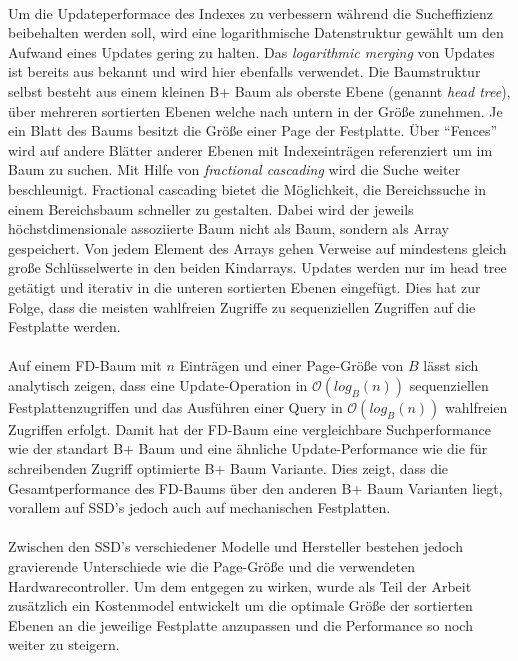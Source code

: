 \paragraph{}
Um die Updateperformace des Indexes zu verbessern während die Sucheffizienz beibehalten werden soll, wird eine logarithmische Datenstruktur gewählt um den Aufwand eines Updates gering zu halten. Das \textit{logarithmic merging} von Updates ist bereits aus  bekannt und wird hier ebenfalls verwendet. Die Baumstruktur selbst besteht aus einem kleinen B+ Baum als oberste Ebene (genannt \textit{head tree}), über mehreren sortierten Ebenen welche nach untern in der Größe zunehmen. Je ein Blatt des Baums besitzt die Größe einer Page der Festplatte. Über \enquote{Fences} wird auf andere Blätter anderer Ebenen mit Indexeinträgen referenziert um im Baum zu suchen. Mit Hilfe von \textit{fractional cascading} wird die Suche weiter beschleunigt. Fractional cascading bietet die Möglichkeit, die Bereichssuche in einem Bereichsbaum schneller zu gestalten. Dabei wird der jeweils höchstdimensionale assoziierte Baum nicht als Baum, sondern als Array gespeichert. Von jedem Element des Arrays gehen Verweise auf mindestens gleich große Schlüsselwerte in den beiden Kindarrays. Updates werden nur im head tree getätigt und iterativ in die unteren sortierten Ebenen eingefügt. Dies hat zur Folge, dass die meisten wahlfreien Zugriffe zu sequenziellen Zugriffen auf die Festplatte werden.\par

\paragraph{}
Auf einem FD-Baum mit $n$ Einträgen und einer Page-Größe von $B$ lässt sich analytisch zeigen, dass eine Update-Operation in $\mathcal{O}(log_B(n))$ sequenziellen Festplattenzugriffen und das Ausführen einer Query in $\mathcal{O}(log_B(n))$ wahlfreien Zugriffen erfolgt. Damit hat der FD-Baum eine vergleichbare Suchperformance wie der standart B+ Baum und eine ähnliche Update-Performance wie die für schreibenden Zugriff optimierte B+ Baum Variante. Dies zeigt, dass die Gesamtperformance des FD-Baums über den anderen B+ Baum Varianten liegt, vorallem auf SSD's jedoch auch auf mechanischen Festplatten.\par 

\paragraph{}
Zwischen den SSD's verschiedener Modelle und Hersteller bestehen jedoch gravierende Unterschiede wie die Page-Größe und die verwendeten Hardwarecontroller. Um dem entgegen zu wirken, wurde als Teil der Arbeit zusätzlich ein Kostenmodel entwickelt um die optimale Größe der sortierten Ebenen an die jeweilige Festplatte anzupassen und die Performance so noch weiter zu steigern.\par

